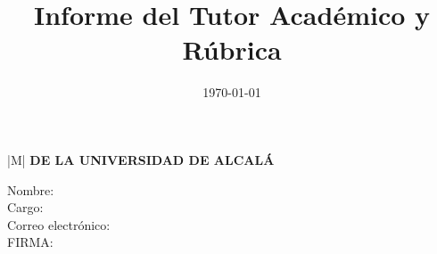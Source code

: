 \documentclass[10pt,a4paper,oneside]{article}
\title{Informe del Tutor Académico y Rúbrica}  %
\date{\today}                                  %
\author{\myAcademicTutorFullName}              %
\begin{document}
%
%




\newpage

\thispagestyle{plain}


\noindent
\begin{tabular}{|M{\textwidth}|}
\hline
\textbf{\small \MakeUppercase{\wordTutorOrTutora} \MakeUppercase{\wordAcademicoOrAcademica} DE LA UNIVERSIDAD DE ALCALÁ}\vspace*{-5pt}\\
\hline
\end{tabular}



\begin{description}
  \item[Nombre:] \myAcademicTutorFullName
  \item[Cargo:] \myAcademicTutorPosition
  \item[Correo electrónico:] \myAcademicTutorEmail
  \item[FIRMA:]

\end{description}

\vspace{2.25cm}
\end{document}
